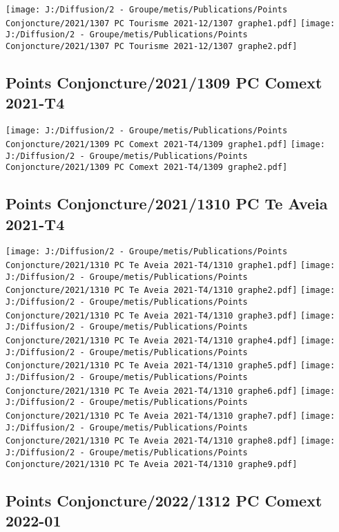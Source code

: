 \documentclass[
]{article}
\begin{document}
\texttt{[image: J:/Diffusion/2 - Groupe/metis/Publications/Points Conjoncture/2021/1307 PC Tourisme 2021-12/1307 graphe1.pdf]}
\texttt{[image: J:/Diffusion/2 - Groupe/metis/Publications/Points Conjoncture/2021/1307 PC Tourisme 2021-12/1307 graphe2.pdf]}

\hypertarget{points-conjoncture20211309-pc-comext-2021-t4}{%
\subsection{Points Conjoncture/2021/1309 PC Comext
2021-T4}\label{points-conjoncture20211309-pc-comext-2021-t4}}

\texttt{[image: J:/Diffusion/2 - Groupe/metis/Publications/Points Conjoncture/2021/1309 PC Comext 2021-T4/1309 graphe1.pdf]}
\texttt{[image: J:/Diffusion/2 - Groupe/metis/Publications/Points Conjoncture/2021/1309 PC Comext 2021-T4/1309 graphe2.pdf]}

\hypertarget{points-conjoncture20211310-pc-te-aveia-2021-t4}{%
\subsection{Points Conjoncture/2021/1310 PC Te Aveia
2021-T4}\label{points-conjoncture20211310-pc-te-aveia-2021-t4}}

\texttt{[image: J:/Diffusion/2 - Groupe/metis/Publications/Points Conjoncture/2021/1310 PC Te Aveia 2021-T4/1310 graphe1.pdf]}
\texttt{[image: J:/Diffusion/2 - Groupe/metis/Publications/Points Conjoncture/2021/1310 PC Te Aveia 2021-T4/1310 graphe2.pdf]}
\texttt{[image: J:/Diffusion/2 - Groupe/metis/Publications/Points Conjoncture/2021/1310 PC Te Aveia 2021-T4/1310 graphe3.pdf]}
\texttt{[image: J:/Diffusion/2 - Groupe/metis/Publications/Points Conjoncture/2021/1310 PC Te Aveia 2021-T4/1310 graphe4.pdf]}
\texttt{[image: J:/Diffusion/2 - Groupe/metis/Publications/Points Conjoncture/2021/1310 PC Te Aveia 2021-T4/1310 graphe5.pdf]}
\texttt{[image: J:/Diffusion/2 - Groupe/metis/Publications/Points Conjoncture/2021/1310 PC Te Aveia 2021-T4/1310 graphe6.pdf]}
\texttt{[image: J:/Diffusion/2 - Groupe/metis/Publications/Points Conjoncture/2021/1310 PC Te Aveia 2021-T4/1310 graphe7.pdf]}
\texttt{[image: J:/Diffusion/2 - Groupe/metis/Publications/Points Conjoncture/2021/1310 PC Te Aveia 2021-T4/1310 graphe8.pdf]}
\texttt{[image: J:/Diffusion/2 - Groupe/metis/Publications/Points Conjoncture/2021/1310 PC Te Aveia 2021-T4/1310 graphe9.pdf]}

\hypertarget{points-conjoncture20221312-pc-comext-2022-01}{%
\subsection{Points Conjoncture/2022/1312 PC Comext
2022-01}\label{points-conjoncture20221312-pc-comext-2022-01}}
\end{document}
